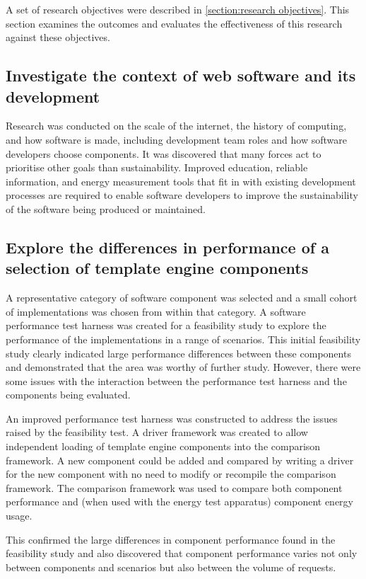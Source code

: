 A set of research objectives were described in \autoref{section:research objectives}. This section examines the outcomes and evaluates the effectiveness of this research against these objectives.

\subsection{Investigate the context of web software and its development}

Research was conducted on the scale of the internet, the history of computing, and how software is made, including development team roles and how software developers choose components. It was discovered that many forces act to prioritise other goals than sustainability. Improved education, reliable information, and energy measurement tools that fit in with existing development processes are required to enable software developers to improve the sustainability of the software being produced or maintained.

\subsection{Explore the differences in performance of a selection of template engine
components}

A representative category of software component was selected and a small cohort of implementations was chosen from within that category. A software performance test harness was created for a feasibility study to explore the performance of the implementations in a range of scenarios. This initial feasibility study clearly indicated large performance differences between these components and demonstrated that the area was worthy of further study. However, there were some issues with the interaction between the performance test harness and the components being evaluated.

An improved performance test harness was constructed to address the issues raised by the feasibility test. A driver framework was created to allow independent loading of \gls{template engine} components into the comparison framework. A new component could be added and compared by writing a driver for the new component with no need to modify or recompile the comparison framework. The comparison framework was used to compare both component performance and (when used with the energy test apparatus) component energy usage.

This confirmed the large differences in component performance found in the feasibility study and also discovered that component performance varies not only between components and scenarios but also between the volume of requests.

